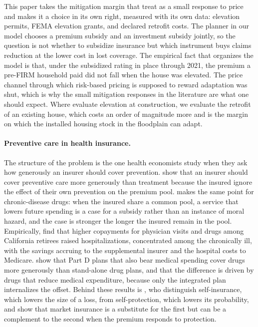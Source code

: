 This paper takes the mitigation margin that \citet{grubersolomon2026} treat as a small response to price and makes it a choice in its own right, measured with its own data: elevation permits, FEMA elevation grants, and declared retrofit costs. The planner in our model chooses a premium subsidy and an investment subsidy jointly, so the question is not whether to subsidize insurance but which instrument buys claims reduction at the lower cost in lost coverage. The empirical fact that organizes the model is that, under the subsidized rating in place through 2021, the premium a pre-FIRM household paid did not fall when the house was elevated. The price channel through which risk-based pricing is supposed to reward adaptation was shut, which is why the small mitigation responses in the literature are what one should expect. Where \citet{hovekampwagner2023} evaluate elevation at construction, we evaluate the retrofit of an existing house, which costs an order of magnitude more and is the margin on which the installed housing stock in the floodplain can adapt.

\paragraph{Preventive care in health insurance.}
The structure of the problem is the one health economists study when they ask how generously an insurer should cover prevention. \citet{ellismanning2007} show that an insurer should cover preventive care more generously than treatment because the insured ignore the effect of their own prevention on the premium pool. \citet{newhouse2006} makes the same point for chronic-disease drugs: when the insured share a common pool, a service that lowers future spending is a case for a subsidy rather than an instance of moral hazard, and the case is stronger the longer the insured remain in the pool. Empirically, \citet{chandragrubermcknight2010} find that higher copayments for physician visits and drugs among California retirees raised hospitalizations, concentrated among the chronically ill, with the savings accruing to the supplemental insurer and the hospital costs to Medicare. \citet{starctown2018} show that Part D plans that also bear medical spending cover drugs more generously than stand-alone drug plans, and that the difference is driven by drugs that reduce medical expenditure, because only the integrated plan internalizes the offset. Behind these results is \citet{ehrlichbecker1972}, who distinguish self-insurance, which lowers the size of a loss, from self-protection, which lowers its probability, and show that market insurance is a substitute for the first but can be a complement to the second when the premium responds to protection.

